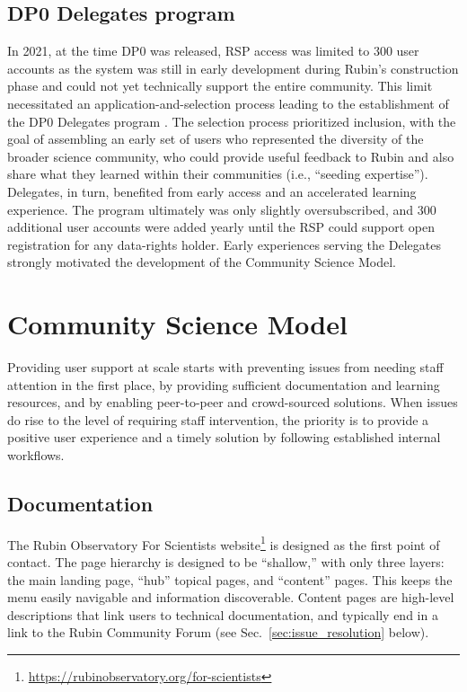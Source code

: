 \subsection{DP0 Delegates program}

In 2021, at the time DP0 was released, RSP access was limited to 300 user accounts as the system was still in early development during Rubin's construction phase and could not yet technically support the entire community.
This limit necessitated an application-and-selection process leading to the establishment of  the DP0 Delegates program \cite{RTN-004}.
The selection process prioritized inclusion, with the goal of assembling an early set of users who represented the diversity of the broader science community, who could provide useful feedback to Rubin and also share what they learned within their communities (i.e., ``seeding expertise'').
Delegates, in turn, benefited from early access and an accelerated learning experience.
The program ultimately was  only slightly oversubscribed, and 300 additional user accounts were added yearly until the RSP could support open registration for any data-rights holder.
Early experiences serving the Delegates strongly motivated the development of the Community Science Model.


\section{Community Science Model}\label{sec:model}

Providing user support at scale starts with preventing issues from needing staff attention in the first place, by providing sufficient documentation and learning resources, and by enabling peer-to-peer and crowd-sourced solutions.
When issues do rise to the level of requiring staff intervention, the priority is to provide a positive user experience and a timely solution by following established internal workflows.

\subsection{Documentation}

The Rubin Observatory For Scientists website\footnote{\url{https://rubinobservatory.org/for-scientists}} is designed as the first point of contact.
The page hierarchy is designed to be ``shallow,'' with only three layers: the main landing page, ``hub'' topical pages, and ``content'' pages.
This keeps the menu easily navigable and information discoverable.
Content pages are high-level descriptions that link users to technical documentation, and typically end in a link to the Rubin Community Forum (see Sec.~\ref{sec:issue_resolution} below).

